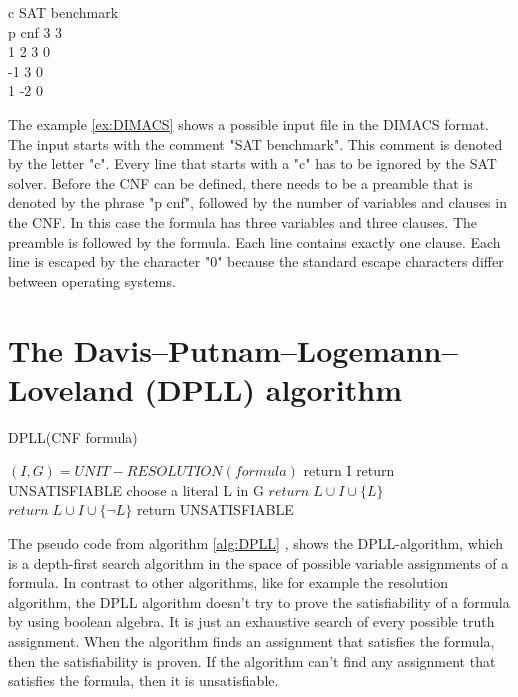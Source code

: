 \begin{leftbar}
\label{ex:DIMACS}
\centering
c SAT benchmark\\
p cnf 3 3\\
1 2 3 0\\
-1 3 0\\
1 -2 0
\end{leftbar}

The example \ref{ex:DIMACS} shows a possible input file in the DIMACS format. The input starts with the comment "SAT benchmark". This comment is denoted by the letter "c". Every line that starts with a "c" has to be ignored by the SAT solver. Before the CNF can be defined, there needs to be a preamble that is denoted by the phrase "p cnf", followed by the number of variables and clauses in the CNF. In this case the formula has three variables and three clauses. The preamble is followed by the formula. Each line contains exactly one clause. Each line is escaped by the character "0" because the standard escape characters differ between operating systems.

\section{The Davis–Putnam–Logemann–Loveland (DPLL) algorithm}

\begin{algorithm}
\caption{DPLL(CNF formula) \cite{biere2009handbook}}\label{alg:DPLL}
\begin{algorithmic}
\State $(I,G) = UNIT-RESOLUTION(formula)$
	\State return I
    \State return UNSATISFIABLE
\Else
	\State choose a literal L in G
		\State $return \; L \cup I \cup \{L\}$
		\State $return \; L \cup I \cup \{\neg L\}$
	\Else
		\State return UNSATISFIABLE
	\EndIf
\EndIf
\end{algorithmic}
\end{algorithm}


The pseudo code from algorithm \ref{alg:DPLL} \cite{biere2009handbook}, shows the DPLL-algorithm, which is a depth-first search algorithm in the space of possible variable assignments of a formula. In contrast to other algorithms, like for example the resolution algorithm, the DPLL algorithm doesn't try to prove the satisfiability of a formula by using boolean algebra. It is just an exhaustive search of every possible truth assignment. When the algorithm finds an assignment that satisfies the formula, then the satisfiability is proven. If the algorithm can't find any assignment that satisfies the formula, then it is unsatisfiable.


